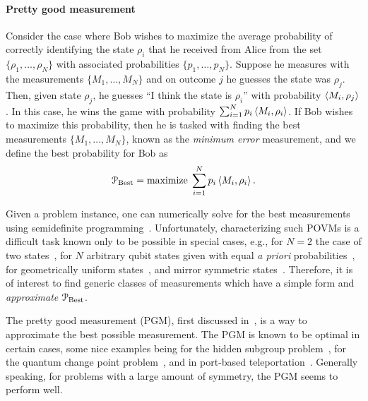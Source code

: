 \paragraph{Pretty good measurement}

Consider the case where Bob wishes to maximize the average probability of correctly identifying the state $\rho_i$ that he received from Alice from the set $\{\rho_1, \ldots, \rho_N\}$ with associated probabilities $\{p_1, \ldots, p_N\}$. 
Suppose he measures with the measurements $\{M_1, \ldots, M_N\}$ and on outcome $j$ he guesses the state was $\rho_j$. 
Then, given state $\rho_j$, he guesses ``I think the state is $\rho_i$'' with probability 
$\left\langle M_i, \rho_j \right\rangle$.  
In this case, he wins the game with probability 
$\sum_{i=1}^N p_i \left\langle M_i, \rho_i \right\rangle$.  
If Bob wishes to maximize this probability, then he is tasked with finding the best measurements $\{M_1, \dots, M_N\}$, known as the \emph{minimum error} measurement, and we define the best probability for Bob as 
\begin{equation}
    \label{eq:ch4_PBM-P_best} 
    \mathcal{P}_{\mathrm{Best}} = \text{maximize} \; \sum_{i=1}^N p_i \left\langle M_i, \rho_i \right\rangle.
\end{equation} 

Given a problem instance, one can numerically solve for the best measurements using semidefinite programming~\cite{cvx}. 
Unfortunately, characterizing such POVMs is a difficult task known only to be possible in special cases, e.g., for $N=2$ the case of two states~\cite{helstrom1969quantum}, for $N$ arbitrary qubit states given with equal \emph{a priori} probabilities~\cite{deconinck2010qubit}, for geometrically uniform states~\cite{eldar2004optimal}, and mirror symmetric states~\cite{andersson2002minimum}.  
Therefore, it is of interest to find generic classes of measurements which have a simple form and \emph{approximate} $\mathcal{P}_{\mathrm{Best}}$.

The pretty good measurement (PGM), first discussed in~\cite{belavkin1975optimaldist, belavkin1975optimal, hughston1993complete}, is a way to approximate the best possible measurement. 
The PGM is known to be optimal in certain cases, some nice examples being for the hidden subgroup problem~\cite{bacon2005optimal, moore2005distinguishing}, for the quantum change point problem~\cite{sentis2016quantum}, and in port-based teleportation~\cite{leditzky2022optimality}.  
Generally speaking, for problems with a large amount of symmetry, the PGM seems to perform well.

